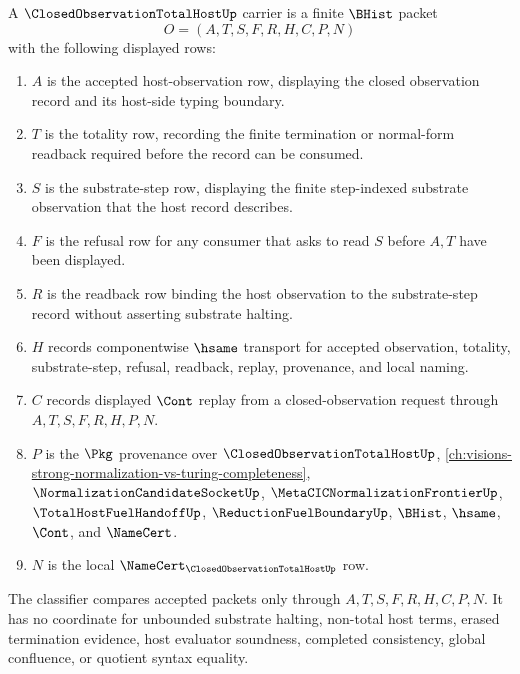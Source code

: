 \begin{definition}
\label{def:closed-observation-total-host-carrier}
A $\ClosedObservationTotalHostUp$ carrier is a finite $\BHist$ packet
$$
O=(A,T,S,F,R,H,C,P,N)
$$
with the following displayed rows:
\begin{enumerate}
\item $A$ is the accepted host-observation row, displaying the closed observation record and its host-side typing boundary.
\item $T$ is the totality row, recording the finite termination or normal-form readback required before the record can be consumed.
\item $S$ is the substrate-step row, displaying the finite step-indexed substrate observation that the host record describes.
\item $F$ is the refusal row for any consumer that asks to read $S$ before $A,T$ have been displayed.
\item $R$ is the readback row binding the host observation to the substrate-step record without asserting substrate halting.
\item $H$ records componentwise $\hsame$ transport for accepted observation, totality, substrate-step, refusal, readback, replay, provenance, and local naming.
\item $C$ records displayed $\Cont$ replay from a closed-observation request through $A,T,S,F,R,H,P,N$.
\item $P$ is the $\Pkg$ provenance over $\ClosedObservationTotalHostUp$, \autoref{ch:visions-strong-normalization-vs-turing-completeness}, $\NormalizationCandidateSocketUp$, $\MetaCICNormalizationFrontierUp$, $\TotalHostFuelHandoffUp$, $\ReductionFuelBoundaryUp$, $\BHist$, $\hsame$, $\Cont$, and $\NameCert$.
\item $N$ is the local $\NameCert_{\ClosedObservationTotalHostUp}$ row.
\end{enumerate}
The classifier compares accepted packets only through $A,T,S,F,R,H,C,P,N$. It has no coordinate for unbounded substrate halting, non-total host terms, erased termination evidence, host evaluator soundness, completed consistency, global confluence, or quotient syntax equality.
\end{definition}

